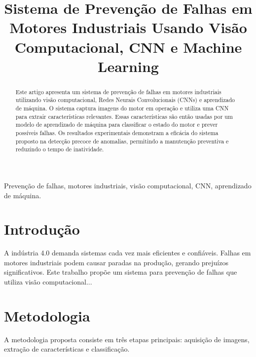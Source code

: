 \documentclass[conference]{IEEEtran}
\begin{document}
\title{Sistema de Prevenção de Falhas em Motores Industriais Usando Visão Computacional, CNN e Machine Learning}

\author{
}

\maketitle

\begin{abstract}
Este artigo apresenta um sistema de prevenção de falhas em motores industriais utilizando visão computacional, Redes Neurais Convolucionais (CNNs) e aprendizado de máquina. O sistema captura imagens do motor em operação e utiliza uma CNN para extrair características relevantes. Essas características são então usadas por um modelo de aprendizado de máquina para classificar o estado do motor e prever possíveis falhas. Os resultados experimentais demonstram a eficácia do sistema proposto na detecção precoce de anomalias, permitindo a manutenção preventiva e reduzindo o tempo de inatividade.
\end{abstract}

\begin{IEEEkeywords}
Prevenção de falhas, motores industriais, visão computacional, CNN, aprendizado de máquina.
\end{IEEEkeywords}

\section{Introdução}
A indústria 4.0 demanda sistemas cada vez mais eficientes e confiáveis. Falhas em motores industriais podem causar paradas na produção, gerando prejuízos significativos.  Este trabalho propõe um sistema para prevenção de falhas que utiliza visão computacional...

\section{Metodologia}
A metodologia proposta consiste em três etapas principais: aquisição de imagens, extração de características e classificação.
\end{document}
